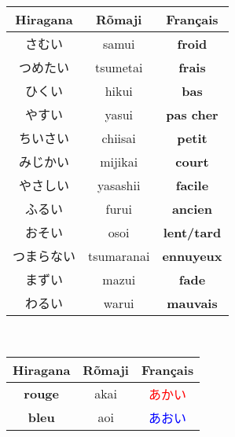 \documentclass[11pt]{report}
\newenvironment{Japanese}{%
\CJKfamily{min}%
\CJKtilde  
\CJKnospace}{}
\begin{document}
\begin{CJK}{UTF8}{}
\begin{Japanese}
\begin{center}
\begin{multicols}{2}
\begin{tabular}{|c|c|c|}
			\end{tabular}
			\begin{tabular}{|c|c|c|}
				\hline
				\textbf{Hiragana} & \textbf{Rõmaji} & \textbf{Français} \\
				\hline
				さむい & samui & \textbf{froid} \\%
				\hline
				つめたい & tsumetai & \textbf{frais} \\%
				\hline
				ひくい & hikui & \textbf{bas} \\%
				\hline
				やすい & yasui & \textbf{pas cher} \\%
				\hline
				ちいさい & chiisai & \textbf{petit} \\%
				\hline
				みじかい & mijikai & \textbf{court} \\%
				\hline
				やさしい & yasashii & \textbf{facile} \\%
				\hline
				ふるい & furui & \textbf{ancien} \\%
				\hline
				おそい & osoi & \textbf{lent/tard} \\%
				\hline
				つまらない & tsumaranai & \textbf{ennuyeux} \\%
				\hline
				まずい & mazui & \textbf{fade} \\%
				\hline
				わるい & warui & \textbf{mauvais} \\%
				\hline
			\end{tabular}
		\end{multicols}
		~\\
		\begin{tabular}{|c|c|c|}
			\hline
			\textbf{Hiragana} & \textbf{Rõmaji} & \textbf{Français} \\
			\hline
			\textbf{rouge} & akai & \textcolor{red}{あかい} \\
			\hline
			\textbf{bleu} & aoi & \textcolor{blue}{あおい} \\

\end{tabular}
\end{center}
\end{Japanese}
\end{CJK}
\end{document}
